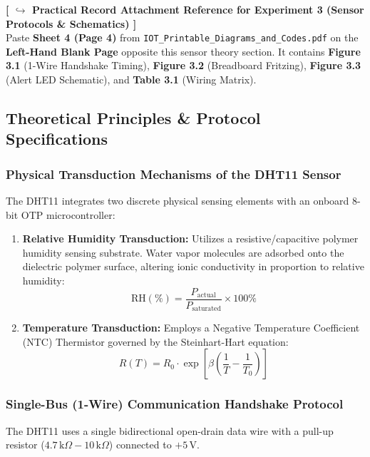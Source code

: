 \documentclass[11pt,a4paper]{article}
\begin{document}
\begin{attachmentbox}
\footnotesize
\textbf{[ $\hookrightarrow$ Practical Record Attachment Reference for Experiment 3 (Sensor Protocols \& Schematics) ]}\\
Paste \textbf{Sheet 4 (Page 4)} from \texttt{IOT\_Printable\_Diagrams\_and\_Codes.pdf} on the \textbf{Left-Hand Blank Page} opposite this sensor theory section. It contains \textbf{Figure 3.1} (1-Wire Handshake Timing), \textbf{Figure 3.2} (Breadboard Fritzing), \textbf{Figure 3.3} (Alert LED Schematic), and \textbf{Table 3.1} (Wiring Matrix).
\end{attachmentbox}

\subsection{Theoretical Principles \& Protocol Specifications}

\subsubsection{Physical Transduction Mechanisms of the DHT11 Sensor}
The DHT11 integrates two discrete physical sensing elements with an onboard 8-bit OTP microcontroller:
\begin{enumerate}[noitemsep]
    \item \textbf{Relative Humidity Transduction:} Utilizes a resistive/capacitive polymer humidity sensing substrate. Water vapor molecules are adsorbed onto the dielectric polymer surface, altering ionic conductivity in proportion to relative humidity:
    \begin{equation}
    \text{RH} (\%) = \frac{P_{\text{actual}}}{P_{\text{saturated}}} \times 100\%
    \end{equation}
    \item \textbf{Temperature Transduction:} Employs a Negative Temperature Coefficient (NTC) Thermistor governed by the Steinhart-Hart equation:
    \begin{equation}
    R(T) = R_0 \cdot \exp\left[ \beta \left( \frac{1}{T} - \frac{1}{T_0} \right) \right]
    \end{equation}
\end{enumerate}

\subsubsection{Single-Bus (1-Wire) Communication Handshake Protocol}
The DHT11 uses a single bidirectional open-drain data wire with a pull-up resistor ($4.7\,\text{k}\Omega - 10\,\text{k}\Omega$) connected to $+5\,\text{V}$.
\end{document}
